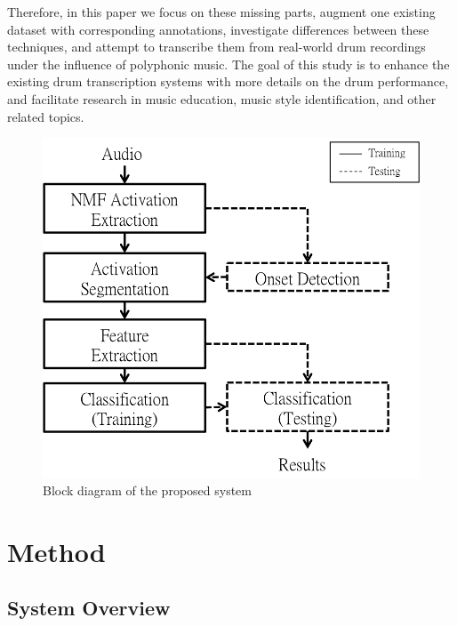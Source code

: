\documentclass{article}
\begin{document}
{{{{{\color{red}{the following is not related work. Find a better place} Therefore, in this paper we focus on these missing parts, augment one existing dataset with corresponding annotations, investigate differences between these techniques, and attempt to transcribe them from real-world drum recordings under the influence of polyphonic music. The goal of this study is to enhance the existing drum transcription systems with more details on the drum performance, and facilitate research in music education, music style identification, and other related topics. 


\begin{figure}
\centering
\includegraphics[width = 7 cm]{./figures/block_diagram.png}
\caption{Block diagram of the proposed system}
\label{fig:block}
\end{figure}

\section{Method}\label{sec:method}
\subsection{System Overview}\label{ssec:overview}

}}}}}
\end{document}
